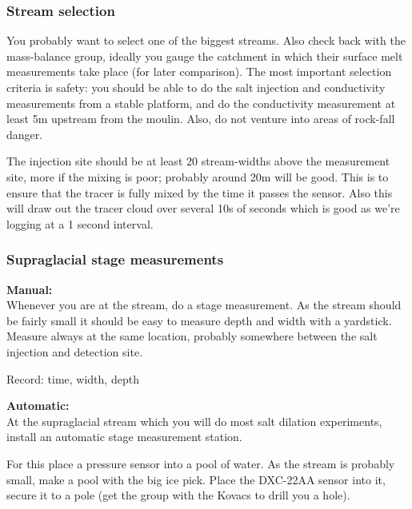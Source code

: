 \documentclass[DIV=15,halfparskip,11pt,headinclude]{scrartcl}
\begin{document}
\subsubsection{Stream selection}
\label{sec-2-1}
You probably want to select one of the biggest streams.  Also check
back with the mass-balance group, ideally you gauge the catchment in
which their surface melt measurements take place (for later
comparison).  The most important selection criteria is safety: you
should be able to do the salt injection and conductivity measurements
from a stable platform, and do the conductivity measurement at least
5m upstream from the moulin.  Also, do not venture into areas of
rock-fall danger.


The injection site should be at least 20 stream-widths above the
measurement site, more if the mixing is poor; probably around 20m
will be good.  This is to ensure that the tracer is fully mixed by the
time it passes the sensor.  Also this will draw out the tracer cloud
over several 10s of seconds which is good as we're logging at a 1
second interval.

\subsubsection{Supraglacial stage measurements}

\textbf{Manual:\\}
Whenever you are at the stream, do a stage measurement.  As the stream
should be fairly small it should be easy to measure depth and width
with a yardstick.  Measure always at the same location, probably
somewhere between the salt injection and detection site.

Record: time, width, depth

\textbf{Automatic:}\\
At the supraglacial stream which you will do most salt dilation
experiments, install an automatic stage measurement station.

For this place a pressure sensor into a pool of water.  As the stream
is probably small, make a pool with the big ice pick.  Place the
DXC-22AA sensor into it, secure it to a pole (get the group
with the Kovacs to drill you a hole).



\end{document}
